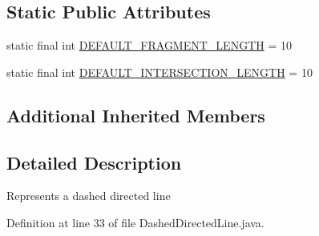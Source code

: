 \subsection*{Static Public Attributes}
\begin{DoxyCompactItemize}
\item 
static final int \hyperlink{classorg_1_1tzi_1_1use_1_1gui_1_1views_1_1diagrams_1_1util_1_1_dashed_directed_line_a44b9fe17df01fba9bf0a9c43126cfc7a}{D\-E\-F\-A\-U\-L\-T\-\_\-\-F\-R\-A\-G\-M\-E\-N\-T\-\_\-\-L\-E\-N\-G\-T\-H} = 10
\item 
static final int \hyperlink{classorg_1_1tzi_1_1use_1_1gui_1_1views_1_1diagrams_1_1util_1_1_dashed_directed_line_a51c9978952d4be1849135fea5658f791}{D\-E\-F\-A\-U\-L\-T\-\_\-\-I\-N\-T\-E\-R\-S\-E\-C\-T\-I\-O\-N\-\_\-\-L\-E\-N\-G\-T\-H} = 10
\end{DoxyCompactItemize}
\subsection*{Additional Inherited Members}


\subsection{Detailed Description}
Represents a dashed directed line 

Definition at line 33 of file Dashed\-Directed\-Line.\-java.



